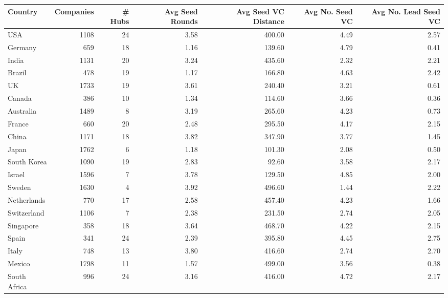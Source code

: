 \begin{tabular}{lrrrrrr}
  \toprule
Country & Companies & # Hubs & Avg Seed Rounds & Avg Seed VC Distance & Avg No. Seed VC & Avg No. Lead Seed VC \\ 
  \midrule
USA & 1108 &  24 & 3.58 & 400.00 & 4.49 & 2.57 \\ 
  Germany & 659 &  18 & 1.16 & 139.60 & 4.79 & 0.41 \\ 
  India & 1131 &  20 & 3.24 & 435.60 & 2.32 & 2.21 \\ 
  Brazil & 478 &  19 & 1.17 & 166.80 & 4.63 & 2.42 \\ 
  UK & 1733 &  19 & 3.61 & 240.40 & 3.21 & 0.61 \\ 
  Canada & 386 &  10 & 1.34 & 114.60 & 3.66 & 0.36 \\ 
  Australia & 1489 &   8 & 3.19 & 265.60 & 4.23 & 0.73 \\ 
  France & 660 &  20 & 2.48 & 295.50 & 4.17 & 2.15 \\ 
  China & 1171 &  18 & 3.82 & 347.90 & 3.77 & 1.45 \\ 
  Japan & 1762 &   6 & 1.18 & 101.30 & 2.08 & 0.50 \\ 
  South Korea & 1090 &  19 & 2.83 & 92.60 & 3.58 & 2.17 \\ 
  Israel & 1596 &   7 & 3.78 & 129.50 & 4.85 & 2.00 \\ 
  Sweden & 1630 &   4 & 3.92 & 496.60 & 1.44 & 2.22 \\ 
  Netherlands & 770 &  17 & 2.58 & 457.40 & 4.23 & 1.66 \\ 
  Switzerland & 1106 &   7 & 2.38 & 231.50 & 2.74 & 2.05 \\ 
  Singapore & 358 &  18 & 3.64 & 468.70 & 4.22 & 2.15 \\ 
  Spain & 341 &  24 & 2.39 & 395.80 & 4.45 & 2.75 \\ 
  Italy & 748 &  13 & 3.80 & 416.60 & 2.74 & 2.70 \\ 
  Mexico & 1798 &  11 & 1.57 & 499.00 & 3.56 & 0.38 \\ 
  South Africa & 996 &  24 & 3.16 & 416.00 & 4.72 & 2.17 \\ 
   \bottomrule
\end{tabular}
